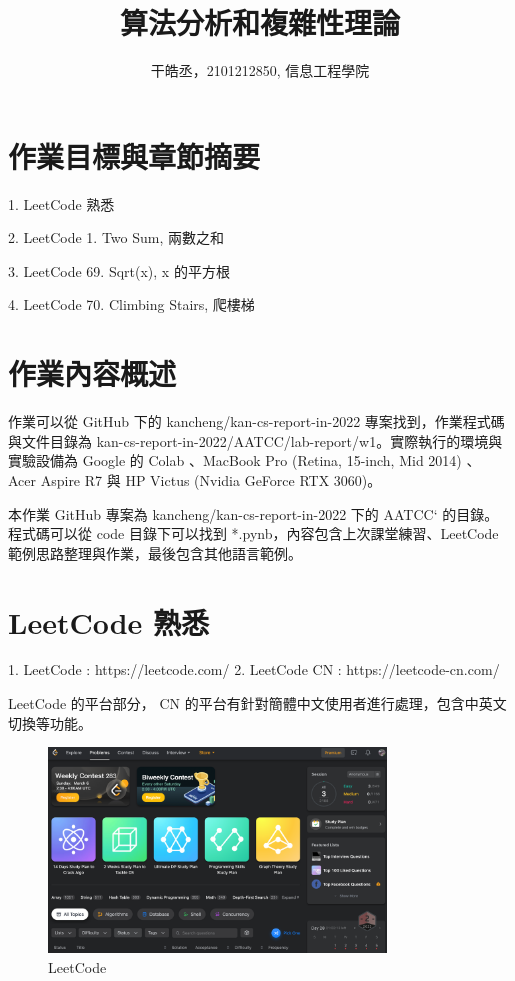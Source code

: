 \documentclass[10pt,UTF8]{ctexart}
\title{算法分析和複雜性理論}
\author{干皓丞，2101212850, 信息工程學院}
\begin{document}
\maketitle


\section{作業目標與章節摘要}

1. LeetCode 熟悉

2. LeetCode 1. Two Sum, 兩數之和

3. LeetCode 69. Sqrt(x), x 的平方根

4. LeetCode 70. Climbing Stairs, 爬樓梯

\section{作業內容概述}

作業可以從 GitHub 下的 kancheng/kan-cs-report-in-2022 專案找到，作業程式碼與文件目錄為 kan-cs-report-in-2022/AATCC/lab-report/w1。實際執行的環境與實驗設備為 Google 的 Colab 、MacBook Pro (Retina, 15-inch, Mid 2014) 、 Acer Aspire R7 與 HP Victus (Nvidia GeForce RTX 3060)。

本作業 GitHub 專案為 kancheng/kan-cs-report-in-2022 下的 AATCC` 的目錄。程式碼可以從 code 目錄下可以找到 *.pynb，內容包含上次課堂練習、LeetCode 範例思路整理與作業，最後包含其他語言範例。

\section{LeetCode 熟悉}

1. LeetCode : https://leetcode.com/
2. LeetCode CN : https://leetcode-cn.com/

LeetCode 的平台部分， CN 的平台有針對簡體中文使用者進行處理，包含中英文切換等功能。

\begin{figure}[H]
\centering 
\includegraphics[width=0.80\textwidth]{c1.png} 
\caption{LeetCode}
\label{Test}
\end{figure}
\end{document}
